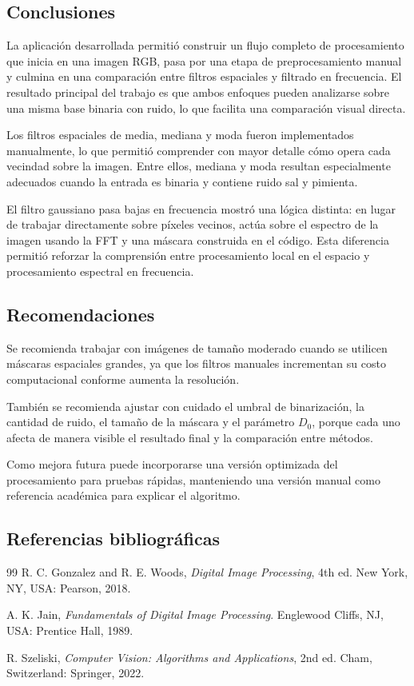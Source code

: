 \documentclass[11pt]{article}
\begin{document}
\subsection{Conclusiones}

La aplicación desarrollada permitió construir un flujo completo de procesamiento que inicia en una imagen RGB, pasa por una etapa de preprocesamiento manual y culmina en una comparación entre filtros espaciales y filtrado en frecuencia. El resultado principal del trabajo es que ambos enfoques pueden analizarse sobre una misma base binaria con ruido, lo que facilita una comparación visual directa.

Los filtros espaciales de media, mediana y moda fueron implementados manualmente, lo que permitió comprender con mayor detalle cómo opera cada vecindad sobre la imagen. Entre ellos, mediana y moda resultan especialmente adecuados cuando la entrada es binaria y contiene ruido sal y pimienta.

El filtro gaussiano pasa bajas en frecuencia mostró una lógica distinta: en lugar de trabajar directamente sobre píxeles vecinos, actúa sobre el espectro de la imagen usando la FFT y una máscara construida en el código. Esta diferencia permitió reforzar la comprensión entre procesamiento local en el espacio y procesamiento espectral en frecuencia.

\subsection{Recomendaciones}

Se recomienda trabajar con imágenes de tamaño moderado cuando se utilicen máscaras espaciales grandes, ya que los filtros manuales incrementan su costo computacional conforme aumenta la resolución.

También se recomienda ajustar con cuidado el umbral de binarización, la cantidad de ruido, el tamaño de la máscara y el parámetro $D_0$, porque cada uno afecta de manera visible el resultado final y la comparación entre métodos.

Como mejora futura puede incorporarse una versión optimizada del procesamiento para pruebas rápidas, manteniendo una versión manual como referencia académica para explicar el algoritmo.

\subsection{Referencias bibliográficas}
{
    \renewcommand{\refname}{}
    \vspace{-1.5em}

    \begin{thebibliography}{99}
        R. C. Gonzalez and R. E. Woods, \textit{Digital Image Processing}, 4th ed. New York, NY, USA: Pearson, 2018.

        A. K. Jain, \textit{Fundamentals of Digital Image Processing}. Englewood Cliffs, NJ, USA: Prentice Hall, 1989.

        R. Szeliski, \textit{Computer Vision: Algorithms and Applications}, 2nd ed. Cham, Switzerland: Springer, 2022.
    \end{thebibliography}
}
\end{document}
